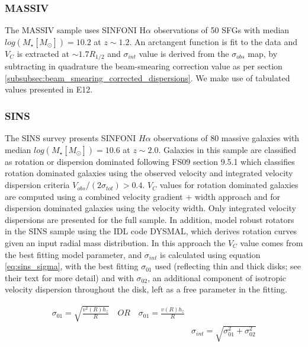 \documentclass[fleqn,usenatbib]{mn2e}
\begin{document}
\subsubsection{MASSIV}\label{subsubsec:MASSIV}
The MASSIV sample \citep[E12]{Epinat2012} uses SINFONI H$\alpha$ observations of 50 SFGs with median $log(M_{\star}[M_{\odot}])=10.2$ at $z\sim1.2$.
An arctangent function is fit to the data and $V_{C}$ is extracted at $\sim1.7R_{1/2}$ and $\sigma_{int}$ value is derived from the $\sigma_{obs}$ map, by subtracting in quadrature the beam-smearing correction value as per section \cref{subsubsec:beam_smearing_corrected_dispersions}.
We make use of tabulated values presented in E12.

\subsubsection{SINS}\label{subsubsec:SINS}
The SINS survey \citep[FS09]{ForsterSchreiber2009} presents SINFONI $H\alpha$ observations of 80 massive galaxies with median $log(M_{\star}[M_{\odot}])=10.6$ at $z\sim2.0$.
Galaxies in this sample are classified as rotation or dispersion dominated following FS09 section 9.5.1 which classifies rotation dominated galaxies using the observed velocity and integrated velocity dispersion criteria $V_{obs}/(2\sigma_{tot}) > 0.4$.
$V_{C}$ values for rotation dominated galaxies are computed using a combined velocity gradient + width approach \citep{ForsterSchreiber2006} and for dispersion dominated galaxies using the velocity width.
Only integrated velocity dispersions are presented for the full sample.
In addition, \cite[C09]{Cresci2009} model robust rotators in the SINS sample using the IDL code DYSMAL, which derives rotation curves given an input radial mass distribution.
In this approach the $V_{C}$ value comes from the best fitting model parameter, and $\sigma_{int}$ is calculated using equation \ref{eq:sins_sigma}, with the best fitting $\sigma_{01}$ used (reflecting thin and thick disks; see their text for more detail) and with $\sigma_{02}$, an additional component of isotropic velocity dispersion throughout the disk, left as a free parameter in the fitting.

\begin{equation}\label{eq:sins_sigma}
\begin{split}
\sigma_{01} = \sqrt{\frac{v^{2}(R)h_{z}}{R}} \quad OR \quad \sigma_{01} = \frac{v(R)h_{z}}{R} \\
& \sigma_{int} = \sqrt{\sigma_{01}^{2} + \sigma_{02}^{2}}
\end{split}
\end{equation}
\end{document}
